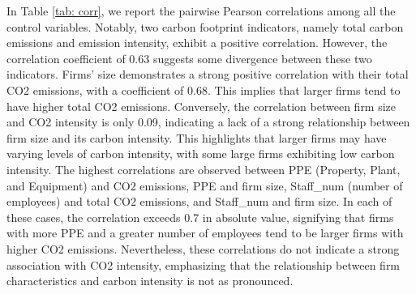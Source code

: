 \documentclass[12pt]{article}
\begin{document}
In Table \ref{tab: corr}, we report the pairwise Pearson correlations among all the control variables. Notably, two carbon footprint indicators, namely total carbon emissions and emission intensity, exhibit a positive correlation. However, the correlation coefficient of 0.63 suggests some divergence between these two indicators. Firms' size demonstrates a strong positive correlation with their total CO2 emissions, with a coefficient of 0.68. This implies that larger firms tend to have higher total CO2 emissions. Conversely, the correlation between firm size and CO2 intensity is only 0.09, indicating a lack of a strong relationship between firm size and its carbon intensity. This highlights that larger firms may have varying levels of carbon intensity, with some large firms exhibiting low carbon intensity. The highest correlations are observed between PPE (Property, Plant, and Equipment) and CO2 emissions, PPE and firm size, Staff\_num (number of employees) and total CO2 emissions, and Staff\_num and firm size. In each of these cases, the correlation exceeds 0.7 in absolute value, signifying that firms with more PPE and a greater number of employees tend to be larger firms with higher CO2 emissions. Nevertheless, these correlations do not indicate a strong association with CO2 intensity, emphasizing that the relationship between firm characteristics and carbon intensity is not as pronounced.
\end{document}
